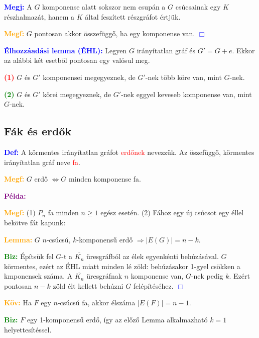 \documentclass[../szamtud.tex]{subfiles}
\begin{document}
        \textcolor{blue}{\textbf{Megj:}} A $G$ komponense alatt sokszor nem csupán a $G$ csúcsainak egy $K$ részhalmazát, hanem a $K$ által feszített részgráfot értjük.

        \textcolor{orange}{\textbf{Megf:}} $G$ pontosan akkor összefüggő, ha egy komponense van. \textcolor{blue}{$\Box$} 

        \textcolor{blue}{\textbf{Élhozzáadási lemma (ÉHL):}} Legyen $G$ irányítatlan gráf és $G' = G + e$. Ekkor az alábbi két esetből pontosan egy valósul meg.

        \textcolor{red}{\textbf{(1)}} $G$ és $G'$ komponensei megegyeznek, de $G'$-nek több köre van, mint $G$-nek.

        \textcolor{green}{\textbf{(2)}} $G$ és $G'$ körei megegyeznek, de $G'$-nek eggyel keveseb komponense van, mint $G$-nek.

    \subsection{Fák és erdők}

        \textcolor{blue}{\textbf{Def:}} A körmentes irányítatlan gráfot \textcolor{red}{erdőnek} nevezzük. Az öszefüggő, körmentes irányítatlan gráf neve \textcolor{red}{fa}.

        \textcolor{orange}{\textbf{Megf:}} $G$ erdő $\Longleftrightarrow  G$ minden komponense fa.

        \textcolor{purple}{\textbf{Példa:}}

        \textcolor{orange}{\textbf{Megf:}} (1) $P_n$ fa minden $n \geq 1$ egész esetén. (2) Fához egy új csúcsot egy éllel bekötve fát kapunk:

        \textcolor{orange}{\textbf{Lemma:}} $G$ $n$-csúcsú, $k$-komponensű erdő $\Rightarrow |E(G)| = n-k$.

        \textcolor{green}{\textbf{Biz:}} Építsük fel $G$-t a $\overline{K_n}$ üresgráfból az élek egyenkénti behúzásával. $G$ körmentes, ezért az ÉHL miatt minden lé zöld: behúzásakor 1-gyel csökken a kmponensek száma. A $\overline{K_n}$ üresgráfnak $n$ komponense van, $G$-nek pedig $k$. Ezért pontosan $n-k$ zöld élt kellett behúzni $G$ felépítéséhez. \textcolor{blue}{$\Box$} 

        \textcolor{orange}{\textbf{Köv:}} Ha $F$ egy $n$-csúcsú fa, akkor élszáma $|E(F)|=n-1$.

        \textcolor{green}{\textbf{Biz:}} $F$ egy 1-komponensű erdő, így az előző Lemma alkalmazható $k=1$ helyettesítéssel.
\end{document}
